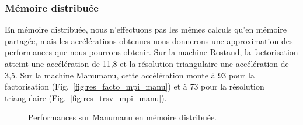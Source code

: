 \subsubsection{Mémoire distribuée}
En mémoire distribuée, nous n'effectuons pas les mêmes calculs qu'en mémoire partagée, mais les accélérations obtenues nous donnerons une approximation des performances que nous pourrons obtenir.
%
Sur la machine Rostand, la factorisation atteint une accélération de 11,8 et la résolution triangulaire une accélération de 3,5.
%
Sur la machine Manumanu, cette accélération monte à 93 pour la factorisation (Fig.~\ref{fig:res_facto_mpi_manu}) et à 73 pour la résolution triangulaire (Fig.~\ref{fig:res_trsv_mpi_manu}).


\begin{figure}[!h]
     \begin{center}
    \end{center}
    \caption{Performances sur Manumanu en mémoire distribuée.}
\end{figure}
